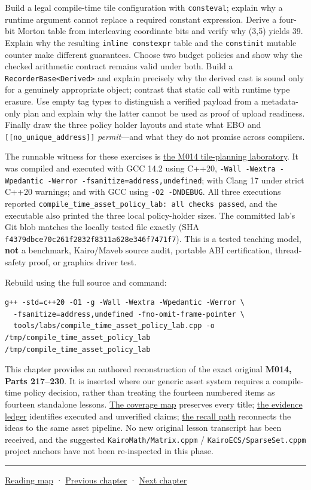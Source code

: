 Build a legal compile-time tile configuration with \texttt{consteval}; explain why a runtime argument cannot replace a required constant expression. Derive a four-bit Morton table from interleaving coordinate bits and verify why (3,5) yields 39. Explain why the resulting \texttt{inline\ constexpr} table and the \texttt{constinit} mutable counter make different guarantees. Choose two budget policies and show why the checked arithmetic contract remains valid under both. Build a \texttt{RecorderBase\textless{}Derived\textgreater{}} and explain precisely why the derived cast is sound only for a genuinely appropriate object; contrast that static call with runtime type erasure. Use empty tag types to distinguish a verified payload from a metadata-only plan and explain why the latter cannot be used as proof of upload readiness. Finally draw the three policy holder layouts and state what EBO and \texttt{{[}{[}no\_unique\_address{]}{]}} \emph{permit}---and what they do not promise across compilers.

The runnable witness for these exercises is \href{tools/labs/compile_time_asset_policy_lab.cpp}{the M014 tile-planning laboratory}. It was compiled and executed with GCC 14.2 using C++20, \texttt{-Wall\ -Wextra\ -Wpedantic\ -Werror\ -fsanitize=address,undefined}; with Clang 17 under strict C++20 warnings; and with GCC using \texttt{-O2\ -DNDEBUG}. All three executions reported \texttt{compile\_time\_asset\_policy\_lab:\ all\ checks\ passed}, and the executable also printed the three local policy-holder sizes. The committed lab's Git blob matches the locally tested file exactly (SHA \texttt{f4379dbce70c261f2832f8311a628e346f7471f7}). This is a tested teaching model, \textbf{not} a benchmark, Kairo/Maveb source audit, portable ABI certification, thread-safety proof, or graphics driver test.

Rebuild using the full source and command:

\begin{verbatim}
g++ -std=c++20 -O1 -g -Wall -Wextra -Wpedantic -Werror \
  -fsanitize=address,undefined -fno-omit-frame-pointer \
  tools/labs/compile_time_asset_policy_lab.cpp -o /tmp/compile_time_asset_policy_lab
/tmp/compile_time_asset_policy_lab
\end{verbatim}

This chapter provides an authored reconstruction of the exact original \textbf{M014, Parts 217--230}. It is inserted where our generic asset system requires a compile-time policy decision, rather than treating the fourteen numbered items as fourteen standalone lessons. \hyperref[appendix-fd090d982a15]{The coverage map} preserves every title; \hyperref[appendix-a103e7846d21]{the evidence ledger} identifies executed and unverified claims; \hyperref[appendix-960160274237]{the recall path} reconnects the ideas to the same asset pipeline. No new original lesson transcript has been received, and the suggested \texttt{KairoMath/Matrix.cppm} / \texttt{KairoECS/SparseSet.cppm} project anchors have not been re-inspected in this phase.

\begin{center}\rule{0.5\linewidth}{0.5pt}\end{center}

\href{Chapter\%20Edition/01\%20-\%20Computing\%20Foundations/00\%20-\%20Reading\%20Map}{Reading map} · \hyperref[01-foundations-i-ch004]{Previous chapter} · \hyperref[01-foundations-i-ch006]{Next chapter}
